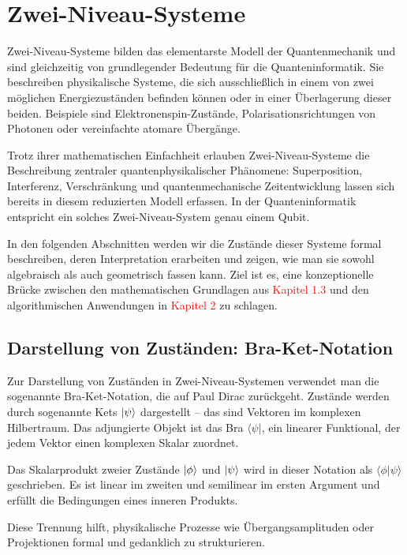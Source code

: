 \section{Zwei-Niveau-Systeme}
\label{Zwei-Niveau-Systeme}

Zwei-Niveau-Systeme bilden das elementarste Modell der Quantenmechanik und sind gleichzeitig von grundlegender Bedeutung für die Quanteninformatik. Sie beschreiben physikalische Systeme, die sich ausschließlich in einem von zwei möglichen Energiezuständen befinden können oder in einer Überlagerung dieser beiden. Beispiele sind Elektronenspin-Zustände, Polarisationsrichtungen von Photonen oder vereinfachte atomare Übergänge.

Trotz ihrer mathematischen Einfachheit erlauben Zwei-Niveau-Systeme die Beschreibung zentraler quantenphysikalischer Phänomene: Superposition, Interferenz, Verschränkung und quantenmechanische Zeitentwicklung lassen sich bereits in diesem reduzierten Modell erfassen. In der Quanteninformatik entspricht ein solches Zwei-Niveau-System genau einem Qubit.

In den folgenden Abschnitten werden wir die Zustände dieser Systeme formal beschreiben, deren Interpretation erarbeiten und zeigen, wie man sie sowohl algebraisch als auch geometrisch fassen kann. Ziel ist es, eine konzeptionelle Brücke zwischen den mathematischen Grundlagen aus \textcolor{red}{Kapitel 1.3} und den algorithmischen Anwendungen in \textcolor{red}{Kapitel 2} zu schlagen.

\subsection{Darstellung von Zuständen: Bra-Ket-Notation}
\label{Darstellung von Zuständen: Bra-Ket-Notation}
Zur Darstellung von Zuständen in Zwei-Niveau-Systemen verwendet man die sogenannte Bra-Ket-Notation, die auf Paul Dirac zurückgeht. Zustände werden durch sogenannte Kets $\ket{\psi}$ dargestellt – das sind Vektoren im komplexen Hilbertraum. Das adjungierte Objekt ist das Bra $\langle \psi|$, ein linearer Funktional, der jedem Vektor einen komplexen Skalar zuordnet.

Das Skalarprodukt zweier Zustände $\ket{\phi}$ und $\ket{\psi}$ wird in dieser Notation als $\langle \phi | \psi \rangle$ geschrieben. Es ist linear im zweiten und semilinear im ersten Argument und erfüllt die Bedingungen eines inneren Produkts.



Diese Trennung hilft, physikalische Prozesse wie Übergangsamplituden oder Projektionen formal und gedanklich zu strukturieren.


